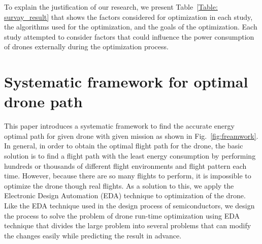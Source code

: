 \documentclass[journal]{./template/IEEEtran}
\begin{document}
To explain the justification of our research, we present Table~\ref{Table: survay_result} that shows the factors considered for optimization in each study, the algorithms used for the optimization, and the goals of the optimization.
Each study attempted to consider factors that could influence the power consumption of drones externally during the optimization process. 


\label{Section: Related works}











\section {Systematic framework for optimal drone path}

This paper introduces a systematic framework to find the accurate energy optimal path for given drone with given mission as shown in Fig.~\ref{fig:freamwork}.
In general, in order to obtain the optimal flight path for the drone, the basic solution is to find a flight path with the least energy consumption by performing hundreds or thousands of different flight environments and flight pattern each time.
However, because there are so many flights to perform, it is impossible to optimize the drone though real flights.
As a solution to this, we apply the Electronic Design Automation (EDA) technique to optimization of the drone.
Like the EDA technique used in the design process of semiconductors, we design the process to solve the problem of drone run-time optimization using EDA technique that divides the large problem into several problems that can modify the changes easily while predicting the result in advance. 
\end{document}
